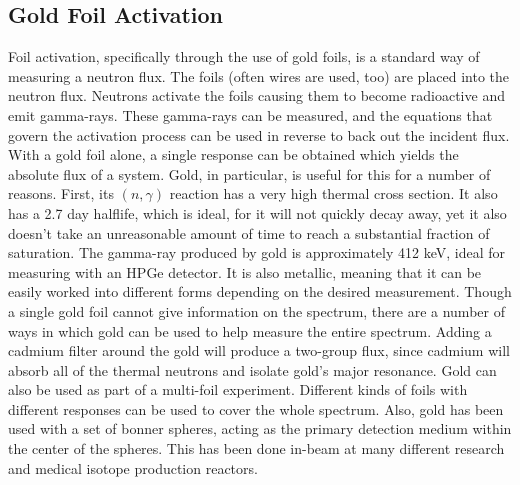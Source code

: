 \subsection{Gold Foil Activation}
Foil activation, specifically through the use of gold foils, is a standard way of measuring a neutron flux.
The foils (often wires are used, too) are placed into the neutron flux.
Neutrons activate the foils causing them to become radioactive and emit gamma-rays.
These gamma-rays can be measured, and the equations that govern the activation process can be used in reverse to back out the incident flux.
With a gold foil alone, a single response can be obtained which yields the absolute flux of a system.
Gold, in particular, is useful for this for a number of reasons.
First, its $(n, \gamma)$ reaction has a very high thermal cross section.
It also has a 2.7 day halflife, which is ideal, for it will not quickly decay away, yet it also doesn't take an unreasonable amount of time to reach a substantial fraction of saturation.
The gamma-ray produced by gold is approximately 412 keV, ideal for measuring with an HPGe detector.
It is also metallic, meaning that it can be easily worked into different forms depending on the desired measurement.
Though a single gold foil cannot give information on the spectrum, there are a number of ways in which gold can be used to help measure the entire spectrum.
Adding a cadmium filter around the gold will produce a two-group flux, since cadmium will absorb all of the thermal neutrons and isolate gold's major resonance.
Gold can also be used as part of a multi-foil experiment.
Different kinds of foils with different responses can be used to cover the whole spectrum.
Also, gold has been used with a set of bonner spheres, acting as the primary detection medium within the center of the spheres.
This has been done in-beam at many different research and medical isotope production reactors.
